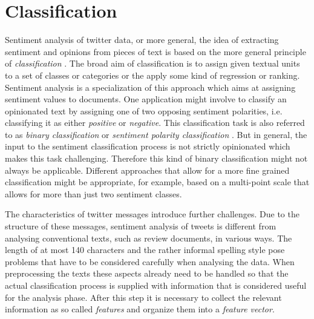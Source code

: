 \section{Classification}


%

Sentiment analysis of twitter data, or more general, the idea of extracting sentiment and opinions from pieces of text is based on the more general principle of \emph{classification} \cite{Pang2002}. The broad aim of classification is to assign given textual units to a set of classes or categories or the apply some kind of regression or ranking. Sentiment analysis is a specialization of this approach which aims at assigning sentiment values to documents. One application might involve to classify an opinionated text by assigning one of two opposing sentiment polarities, i.e. classifying it as either \emph{positive} or \emph{negative}. This classification task is also referred to as \emph{binary classification} or \emph{sentiment polarity classification} \cite{Pang2002}. But in general, the input to the sentiment classification process is not strictly opinionated which makes this task challenging. Therefore this kind of binary classification might not always be applicable. Different approaches that allow for a more fine grained classification might be appropriate, for example, based on a multi-point scale that allows for more than just two sentiment classes.

The characteristics of twitter messages introduce further challenges. Due to the structure of these messages, sentiment analysis of tweets is different from analysing conventional texts, such as review documents, in various ways. The length of at most 140 characters and the rather informal spelling style pose problems that have to be considered carefully when analysing the data. When preprocessing the texts these aspects already need to be handled so that the actual classification process is supplied with information that is considered useful for the analysis phase. After this step it is necessary to collect the relevant information as so called \emph{features} and organize them into a \emph{feature vector}.

